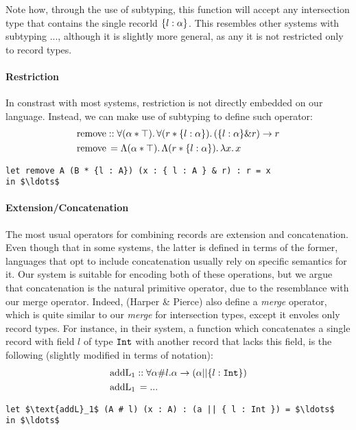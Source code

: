Note how, through the use of subtyping, this function will accept any intersection type that 
contains the single recorld $\{ l : \alpha \}$.
This resembles other systems with subtyping ..., although it is slightly more general, as any it is not 
restricted only to record types. 

\paragraph{Restriction}

In constrast with most systems, restriction is not directly embedded on our language.
Instead, we can make use of subtyping to define such operator: 
\begin{align*}
&\text{remove} :: \forall (\alpha * \top).\, \forall (r * \{ l : \alpha \}).\, ({\{ l : \alpha \} \& r) \rightarrow r} \\ 
&\text{remove} \, = \Lambda (\alpha * \top).\, \Lambda (r * \{ l : \alpha \}).\, \lambda x.\, x 
\end{align*}

\begin{lstlisting}[mathescape=true]
let remove A (B * {l : A}) (x : { l : A } & r) : r = x
in $\ldots$ 
\end{lstlisting}

\paragraph{Extension/Concatenation}

The most usual operators for combining records are extension and concatenation.
Even though that in some systems, the latter is defined in terms of the former, languages that
opt to include concatenation usually rely on specific semantics for it. 
Our system is suitable for encoding both of these operations, but we argue that concatenation is
the natural primitive operator, due to the resemblance with our merge operator.
Indeed, (Harper \& Pierce) also define a \emph{merge} operator, which is quite similar to
our \emph{merge} for intersection types, except it envoles only record types.
For instance, in their system, a function which concatenates a single record with field $l$ of type $\texttt{Int}$
with another record that lacks this field, is the following (slightly modified in terms of 
notation):
\begin{align*}
&\text{addL}_1 :: \forall \alpha\#l. \alpha \rightarrow (\alpha || \{ l : \texttt{Int} \}) \\ 
&\text{addL}_1 \, = ...
\end{align*}
\begin{lstlisting}[mathescape=true]
let $\text{addL}_1$ (A # l) (x : A) : (a || { l : Int }) = $\ldots$ 
in $\ldots$ 
\end{lstlisting}

